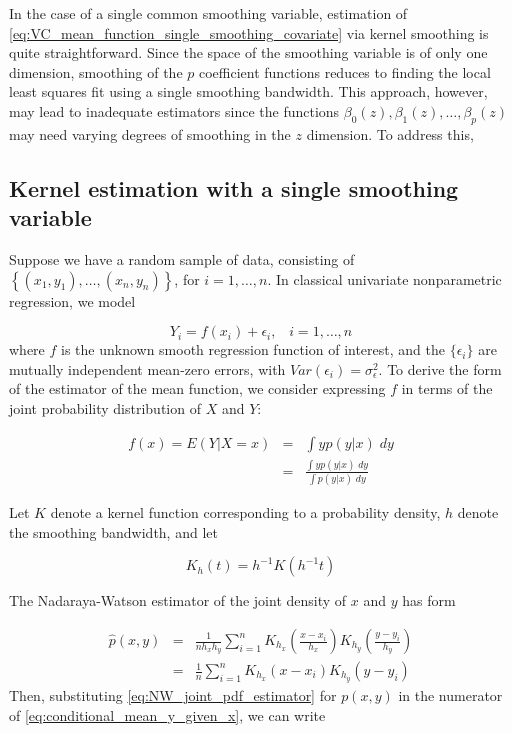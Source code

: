 \documentclass[12pt]{article}
\begin{document}
In the case of a single common smoothing variable, estimation of \ref{eq:VC_mean_function_single_smoothing_covariate} via kernel smoothing is quite straightforward. Since the space of the smoothing variable is of only one dimension, smoothing of the $p$ coefficient functions reduces to finding the local least squares fit using a single smoothing bandwidth. This approach, however, may lead to inadequate estimators since the functions $\beta_0\left(z\right), \beta_1\left(z\right), \dots, \beta_p\left(z\right)$ may need varying degrees of smoothing in the $z$ dimension. To address this, 

\subsection{Kernel estimation with a single smoothing variable}

Suppose we have a random sample of data, consisting of $\left\{ \left(x_1, y_1\right),\dots, \left(x_n, y_n\right)\right\}$, for $i=1,\dots,n$. In classical univariate nonparametric regression, we model 

\begin{equation}
Y_i = f\left(x_i\right) + \epsilon_i,\;\;\;i=1,\dots, n \label{eq:classical_NP_regression_model}
\end{equation} 
\noindent
where $f$ is the unknown smooth regression function of interest, and the $\lbrace \epsilon_i \rbrace$ are mutually independent mean-zero errors, with $Var\left(\epsilon_i\right)=\sigma_\epsilon^2$. To derive the form of the estimator of the mean function, we consider expressing $f$ in terms of the joint probability distribution of $X$ and $Y$:

\begin{eqnarray} 
f\left(x\right) = E\left(Y \vert X=x\right) &=& \int yp(y \vert x)\;dy \nonumber \\
&=& \frac{ \int yp(y \vert x)\;dy }{ \int p(y \vert x)\;dy } \label{eq:conditional_mean_y_given_x}
\end{eqnarray}
 
Let $K$ denote a kernel function corresponding to a probability density, $h$ denote the smoothing bandwidth, and let 

\[
K_h\left(t\right) = h^{-1} K\left(h^{-1} t \right)
\] 

The Nadaraya-Watson estimator of the joint density of $x$ and $y$ has form

\begin{eqnarray} 
\hat{p}\left(x,y\right) &=& \frac{1}{nh_x h_y}\sum_{i=1}^{n} K_{h_x}\left(\frac{x-x_i}{h_x}\right) K_{h_y}\left(\frac{y-y_i}{h_y}\right)  \nonumber \\ 
&=& \frac{1}{n}\sum_{i=1}^{n} K_{h_x}\left(x-x_i\right) K_{h_y}\left(y-y_i\right) \label{eq:NW_joint_pdf_estimator} 
\end{eqnarray}
\noindent
Then, substituting \ref{eq:NW_joint_pdf_estimator} for $p\left(x,y\right)$ in the numerator of \ref{eq:conditional_mean_y_given_x}, we can write 
\end{document}
